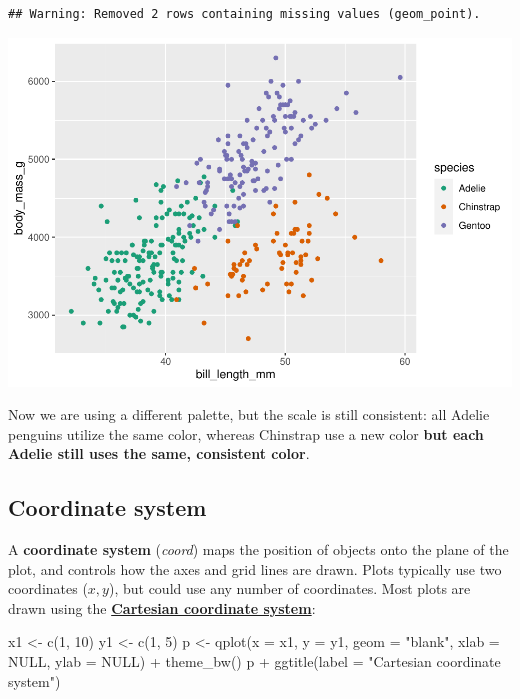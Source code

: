 \documentclass[
]{article}
\newenvironment{Shaded}{\begin{snugshade}}{\end{snugshade}}
\newcommand{\AttributeTok}[1]{\textcolor[rgb]{0.77,0.63,0.00}{#1}}
\newcommand{\ConstantTok}[1]{\textcolor[rgb]{0.00,0.00,0.00}{#1}}
\newcommand{\DecValTok}[1]{\textcolor[rgb]{0.00,0.00,0.81}{#1}}
\newcommand{\FunctionTok}[1]{\textcolor[rgb]{0.00,0.00,0.00}{#1}}
\newcommand{\NormalTok}[1]{#1}
\newcommand{\OtherTok}[1]{\textcolor[rgb]{0.56,0.35,0.01}{#1}}
\newcommand{\SpecialCharTok}[1]{\textcolor[rgb]{0.00,0.00,0.00}{#1}}
\newcommand{\StringTok}[1]{\textcolor[rgb]{0.31,0.60,0.02}{#1}}
\begin{document}
\begin{verbatim}
## Warning: Removed 2 rows containing missing values (geom_point).
\end{verbatim}

\includegraphics{Grammar-of-Graphics_files/figure-latex/scale_color_palette-1.pdf}

Now we are using a different palette, but the scale is still consistent:
all Adelie penguins utilize the same color, whereas Chinstrap use a new
color \textbf{but each Adelie still uses the same, consistent color}.

\hypertarget{coordinate-system}{%
\subsection{Coordinate system}\label{coordinate-system}}

A \textbf{coordinate system} (\emph{coord}) maps the position of objects
onto the plane of the plot, and controls how the axes and grid lines are
drawn. Plots typically use two coordinates (\(x, y\)), but could use any
number of coordinates. Most plots are drawn using the
\href{https://en.wikipedia.org/wiki/Cartesian_coordinate_system}{\textbf{Cartesian
coordinate system}}:

\begin{Shaded}
\begin{Highlighting}[]
\NormalTok{x1 }\OtherTok{\textless{}{-}} \FunctionTok{c}\NormalTok{(}\DecValTok{1}\NormalTok{, }\DecValTok{10}\NormalTok{)}
\NormalTok{y1 }\OtherTok{\textless{}{-}} \FunctionTok{c}\NormalTok{(}\DecValTok{1}\NormalTok{, }\DecValTok{5}\NormalTok{)}
\NormalTok{p }\OtherTok{\textless{}{-}} \FunctionTok{qplot}\NormalTok{(}\AttributeTok{x =}\NormalTok{ x1, }\AttributeTok{y =}\NormalTok{ y1, }\AttributeTok{geom =} \StringTok{"blank"}\NormalTok{, }\AttributeTok{xlab =} \ConstantTok{NULL}\NormalTok{, }\AttributeTok{ylab =} \ConstantTok{NULL}\NormalTok{) }\SpecialCharTok{+}
  \FunctionTok{theme\_bw}\NormalTok{()}
\NormalTok{p }\SpecialCharTok{+}
  \FunctionTok{ggtitle}\NormalTok{(}\AttributeTok{label =} \StringTok{"Cartesian coordinate system"}\NormalTok{)}
\end{Highlighting}
\end{Shaded}
\end{document}

